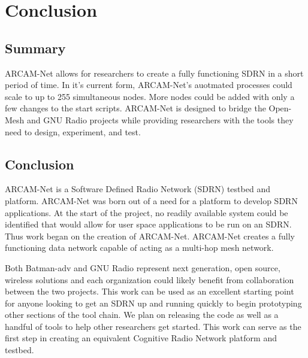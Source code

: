 
\chapter{Conclusion} %

\label{Chapter6} %




\section{Summary}

ARCAM-Net allows for researchers to create a fully functioning SDRN in a short period of time. In it's current form, ARCAM-Net's auotmated processes could scale to up to 255 simultaneous nodes. More nodes could be added with only a few changes to the start scripts. ARCAM-Net is designed to bridge the Open-Mesh and GNU Radio projects while providing researchers with the tools they need to design, experiment, and test. 


\section{Conclusion}

ARCAM-Net is a Software Defined Radio Network (SDRN) testbed and platform. ARCAM-Net was born out of a need for a platform to develop SDRN applications. At the start of the project, no readily available system could be identified that would allow for user space applications to be run on an SDRN. Thus work began on the creation of ARCAM-Net. ARCAM-Net creates a fully functioning data network capable of acting as a multi-hop mesh network.

Both Batman-adv and GNU Radio represent next generation, open source, wireless solutions and each organization could likely benefit from collaboration between the two projects. This work can be used as an excellent starting point for anyone looking to get an SDRN up and running quickly to begin prototyping other sections of the tool chain. We plan on releasing the code as well as a handful of tools to help other researchers get started. This work can serve as the first step in creating an equivalent Cognitive Radio Network platform and testbed. 

